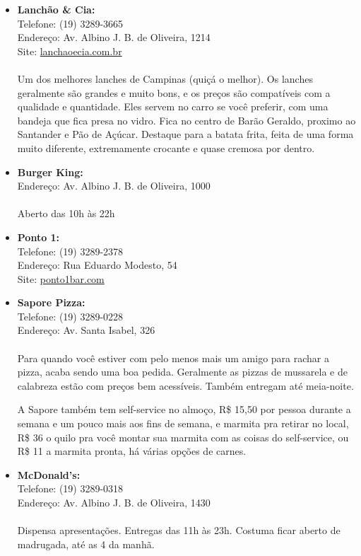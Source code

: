 \begin{itemize}
    \item   \textbf{Lanchão \& Cia:}
        \\Telefone: (19) 3289-3665
        \\Endereço: Av. Albino J. B. de Oliveira, 1214
        \\Site: \url{lanchaoecia.com.br}
        \\\\
        Um dos melhores lanches de Campinas (quiçá o melhor). Os lanches
        geralmente são grandes e muito bons, e os preços são compatíveis com a
        qualidade e quantidade. Eles servem no carro se você preferir, com uma
        bandeja que fica presa no vidro. Fica no centro de Barão Geraldo,
        proximo ao Santander e Pão de Açúcar. Destaque para a batata frita,
        feita de uma forma muito diferente, extremamente crocante e quase
        cremosa por dentro.

    \item   \textbf{Burger King:}
        \\Endereço: Av. Albino J. B. de Oliveira, 1000
        \\\\
        Aberto das 10h às 22h

    \item   \textbf{Ponto 1:}
        \\Telefone: (19) 3289-2378
        \\Endereço: Rua Eduardo Modesto, 54
        \\Site: \url{ponto1bar.com}

      \item \textbf{Sapore Pizza:}
        \\Telefone: (19) 3289-0228
        \\Endereço: Av. Santa Isabel, 326
        \\\\
        Para quando você estiver com pelo menos mais um amigo para rachar a
        pizza, acaba sendo uma boa pedida. Geralmente as pizzas de mussarela e
        de calabreza estão com preços bem acessíveis. Também entregam até
        meia-noite.

        A Sapore também tem self-service no almoço, R\$ 15,50 por pessoa durante
        a semana e um pouco mais aos fins de semana, e marmita pra retirar no
        local, R\$ 36 o quilo pra você montar sua marmita com as coisas do
        self-service, ou R\$ 11 a marmita pronta, há várias opções de carnes.

    \item   \textbf{McDonald's:}
        \\Telefone: (19) 3289-0318
        \\Endereço: Av. Albino J. B. de Oliveira, 1430
        \\\\
        Dispensa apresentações. Entregas das 11h às 23h. Costuma ficar aberto de
        madrugada, até as 4 da manhã.


\end{itemize}
